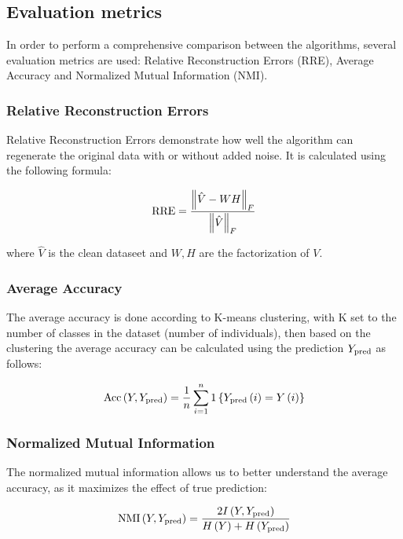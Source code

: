 \documentclass{article} %
\begin{document}
\subsection{Evaluation metrics}
In order to perform a comprehensive comparison between the algorithms, several evaluation metrics are used: Relative Reconstruction Errors (RRE), Average Accuracy and Normalized Mutual Information (NMI).

\subsubsection{Relative Reconstruction Errors}
Relative Reconstruction Errors demonstrate how well the algorithm can regenerate the original data with or without added noise. It is calculated using the following formula:

\begin{equation}
\textup{RRE} = \frac{\left \| \hat{V} - WH \right \|_F}{\left \| \hat{V} \right \|_F}
\end{equation}

where $\hat{V}$ is the clean dataseet and $W,H$ are the factorization of $V$.

\subsubsection{Average Accuracy}
The average accuracy is done according to K-means clustering, with K set to the number of classes in the dataset (number of individuals), then based on the clustering the average accuracy can be calculated using the prediction $Y_{\textup{pred}}$ as follows:

\begin{equation}
\textup{Acc} \left ( Y, Y_{\textup{pred}} \right ) = \frac{1}{n} \sum_{i=1}^{n} 1 \left \{ Y_{\textup{pred}} \left ( i \right ) = Y \left ( i \right ) \right \}
\end{equation}

\subsubsection{Normalized Mutual Information}
The normalized mutual information allows us to better understand the average accuracy, as it maximizes the effect of true prediction:

\begin{equation}
\textup{NMI} \left ( Y, Y_{\textup{pred}} \right ) = \frac{2I \left ( Y, Y_{\textup{pred}} \right )}{H \left ( Y \right ) + H \left ( Y_{\textup{pred}} \right )}
\end{equation}
\end{document}
